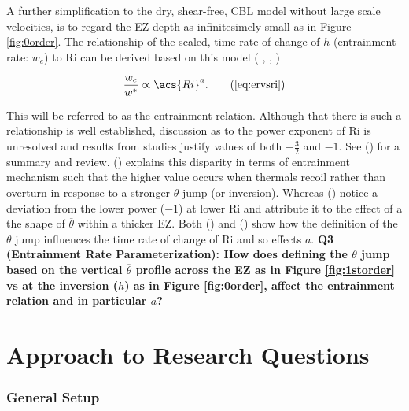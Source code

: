 A further simplification to the dry, shear-free, \acs{CBL} model without large scale velocities, is to regard the \acs{EZ} depth as infinitesimely small as in Figure \ref{fig:0order}.  The relationship of the scaled, time rate of change of $h$ (entrainment rate: $w_{e}$) to \acs{Ri} can be derived based on this model (\citeauthor{Tennekes73} \citeyear{Tennekes73}, \citeauthor{Deardorff79} \citeyear{Deardorff79}, \citeauthor{FedConzMir04} \citeyear{FedConzMir04})

\begin{equation}
\frac{w_{e}}{w^{*}} \propto  \acs{Ri}^{a}.\tag{\ref{eq:ervsri}} 
\end{equation}
 
This will be referred to as the entrainment relation.  Although that there is such a relationship is well established, discussion as to the power exponent of \acs{Ri} is unresolved and results from studies justify values of both $-\frac{3}{2}$ and $-1$. See \citeauthor{Traum11} (\citeyear{Traum11}) for a summary and review.  \citeauthor{Turner86} (\citeyear{Turner86}) explains this disparity in terms of entrainment mechanism such that the higher value occurs when thermals recoil rather than overturn in response to a stronger $\theta$ jump (or inversion).  Whereas \citeauthor{SullMoengStev} (\citeyear{SullMoengStev}) notice a deviation from the lower power ($-1$) at lower \acs{Ri} and attribute it to the effect of a the shape of $\overline{\theta}$ within a thicker \acs{EZ}.  Both \citeauthor{FedConzMir04} (\citeyear{FedConzMir04}) and \citeauthor{GarciaMellado} (\citeyear{GarciaMellado}) show how the definition of the $\theta$ jump influences the time rate  of change of \acs{Ri} and so effects $a$. \textbf{Q3 (Entrainment Rate Parameterization): How does defining the $\theta$ jump based on the vertical $\overline{\theta}$ profile across the \acs{EZ} as in Figure \ref{fig:1storder} vs at the inversion ($h$) as in Figure \ref{fig:0order}, affect the entrainment relation and in particular $a$?}\\


\section{Approach to Research Questions}
\label{sec:Approach}
\subsubsection{General Setup}

